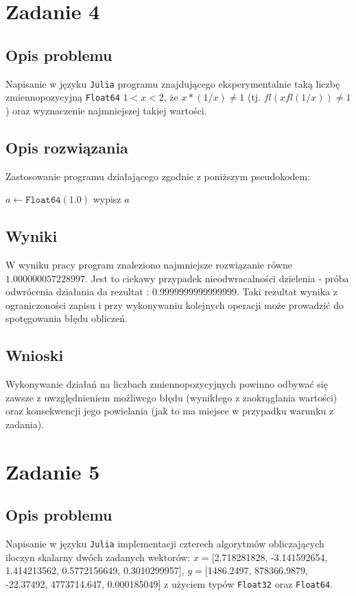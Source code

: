 \documentclass{classrep}
\begin{document}
\section{Zadanie 4}
	\subsection{Opis problemu}
		Napisanie w języku \texttt{Julia} programu znajdującego eksperymentalnie taką liczbę zmiennopozycyjną 
		\texttt{Float64} $1<x<2$, że $x*(1/x)\neq1$ (tj. $fl(xfl(1/x))\neq1$) oraz wyznaczenie najmniejszej takiej
		wartości.
	\subsection{Opis rozwiązania}
		Zastosowanie programu działającego zgodnie z poniższym pseudokodem:
		\begin{algorithm}
		\begin{algorithmic}
			\State $a\gets \texttt{Float64}(1.0)$
					wypisz $a$
				\EndIf
			\EndWhile
		\end{algorithmic}
		\caption{}
		\end{algorithm}
		
	\subsection{Wyniki}
		W wyniku pracy program znaleziono najmniejsze rozwiązanie równe $1.000000057228997$.
		Jest to ciekawy przypadek nieodwracalności dzielenia - próba odwrócenia działania da rezultat : $0.9999999999999999$.
		Taki rezultat wynika z ograniczoności zapisu i przy wykonywaniu kolejnych operacji może prowadzić do spotęgowania błędu obliczeń.
	\subsection{Wnioski}
		Wykonywanie działań na liczbach zmiennopozycyjnych powinno odbywać się zawsze z uwzględnieniem możliwego błędu (wynikłego z zaokrąglania wartości) 
		oraz konsekwencji jego powielania (jak to ma miejsce w przypadku warunku z zadania).
\section{Zadanie 5}
	\subsection{Opis problemu}
		Napisanie w języku \texttt{Julia} implementacji czterech algorytmów obliczających iloczyn skalarny dwóch 
		zadanych wektorów: 
		$x=$[2.718281828, -3.141592654, 1.414213562, 0.5772156649, 0.3010299957], 
		$y=$[1486.2497, 878366.9879, -22.37492, 4773714.647, 0.000185049] z użyciem typów \texttt{Float32} oraz 
		\texttt{Float64}.
\end{document}
